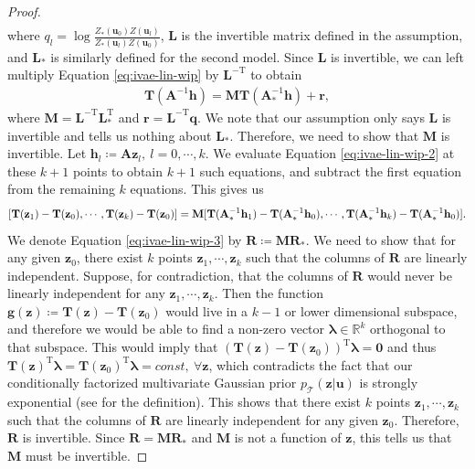 \documentclass{article} %
\theoremstyle{plain}
\theoremstyle{definition}
\theoremstyle{remark}
\begin{document}
\begin{proof}
\begin{align}
    \end{align}
    where $q_l=\log \frac{Z_*(\mathbf{u}_0)Z(\mathbf{u}_l)}{Z_*(\mathbf{u}_l)Z(\mathbf{u}_0)}$, $\mathbf{L}$ is the invertible matrix defined in the assumption, and $\mathbf{L}_{*}$ is similarly defined for the second model. Since $\mathbf{L}$ is invertible, we can left multiply Equation \eqref{eq:ivae-lin-wip} by $\mathbf{L}^{-\text{T}}$ to obtain
    \begin{align}
        \mathbf{T}(\mathbf{A}^{-1}\mathbf{h})=\mathbf{M}\mathbf{T}(\mathbf{A}_{*}^{-1}\mathbf{h}) +\mathbf{r},\label{eq:ivae-lin-wip-2}
    \end{align}
    where $\mathbf{M}=\mathbf{L}^{-\text{T}}\mathbf{L}_{*}^{\text{T}}$ and $\mathbf{r}=\mathbf{L}^{-\text{T}}\mathbf{q}$. We note that our assumption only says $\mathbf{L}$ is invertible and tells us nothing about $\mathbf{L}_{*}$. Therefore, we need to show that $\mathbf{M}$ is invertible.
    Let $\mathbf{h}_l\coloneqq\mathbf{A}\mathbf{z}_l,~l=0,\cdots,k$. We evaluate Equation \eqref{eq:ivae-lin-wip-2} at these $k+1$ points to obtain $k+1$ such equations, and subtract the first equation from the remaining $k$ equations. This gives us
    \begin{equation}
    \small
        [\mathbf{T}(\mathbf{z}_1)-\mathbf{T}(\mathbf{z}_0),\cdots,\mathbf{T}(\mathbf{z}_k)-\mathbf{T}(\mathbf{z}_0)]=\mathbf{M}[\mathbf{T}(\mathbf{A}_{*}^{-1}\mathbf{h}_1)-\mathbf{T}(\mathbf{A}_{*}^{-1}\mathbf{h}_0),\cdots,\mathbf{T}(\mathbf{A}_{*}^{-1}\mathbf{h}_k)-\mathbf{T}(\mathbf{A}_{*}^{-1}\mathbf{h}_0)].\label{eq:ivae-lin-wip-3}
    \end{equation}
    We denote Equation \eqref{eq:ivae-lin-wip-3} by $\mathbf{R}\coloneqq\mathbf{M}\mathbf{R}_{*}$. We need to show that for any given $\mathbf{z}_0$, there exist $k$ points $\mathbf{z}_1,\cdots,\mathbf{z}_k$ such that the columns of $\mathbf{R}$ are linearly independent. Suppose, for contradiction, that the columns of $\mathbf{R}$ would never be linearly independent for any $\mathbf{z}_1,\cdots,\mathbf{z}_k$. Then the function $\mathbf{g}(\mathbf{z})\coloneqq\mathbf{T}(\mathbf{z})-\mathbf{T}(\mathbf{z}_0)$ would live in a $k-1$ or lower dimensional subspace, and therefore we would be able to find a non-zero vector $\boldsymbol{\lambda}\in\mathbb{R}^k$ orthogonal to that subspace. This would imply that $(\mathbf{T}(\mathbf{z})-\mathbf{T}(\mathbf{z}_0))^{\text{T}}\boldsymbol{\lambda}=\mathbf{0}$ and thus $\mathbf{T}(\mathbf{z})^{\text{T}}\boldsymbol{\lambda}=\mathbf{T}(\mathbf{z}_0)^{\text{T}}\boldsymbol{\lambda}=const,~\forall\mathbf{z}$, which contradicts the fact that our conditionally factorized multivariate Gaussian prior $p_{\mathcal{T}}(\mathbf{z}|\mathbf{u})$ is strongly exponential (see \citet{Khemakhem_Kingma_Monti_Hyvarinen_2020} for the definition). This shows that there exist $k$ points $\mathbf{z}_1,\cdots,\mathbf{z}_k$ such that the columns of $\mathbf{R}$ are linearly independent for any given $\mathbf{z}_0$. Therefore, $\mathbf{R}$ is invertible. Since $\mathbf{R}=\mathbf{M}\mathbf{R}_{*}$ and $\mathbf{M}$ is not a function of $\mathbf{z}$, this tells us that $\mathbf{M}$ must be invertible.
    

\end{proof}
\end{document}

